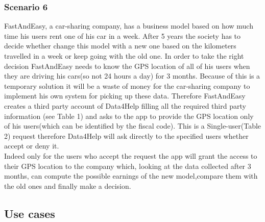     \subsubsection{Scenario 6}
    FastAndEasy, a car-sharing company, has a business model based on how much time his users rent one of his car in a week. After 5 years the society has to decide whether change this model with a new one based on the kilometers travelled in a week or keep going with the old one. In order to take the right decision FastAndEasy needs to know the GPS location of all of his users when they are driving his cars(so not 24 hours a day) for 3 months. Because of this is a temporary solution it will be a waste of money for the car-sharing company to implement his own system for picking up these data. Therefore FastAndEasy creates a third party account of Data4Help filling all the required third party information (see Table 1) and asks to the app to provide the GPS location only of his users(which can be identified by the fiscal code). This is a Single-user(Table 2) request therefore  Data4Help will ask directly to the specified users whether accept or deny it.\\ Indeed only for the users who accept the request the app will grant the access to their GPS location to the company which,  looking at the data collected after 3 months, can compute the possible earnings of the new model,compare them with the old ones and finally make a decision.



  \subsection{Use cases}



